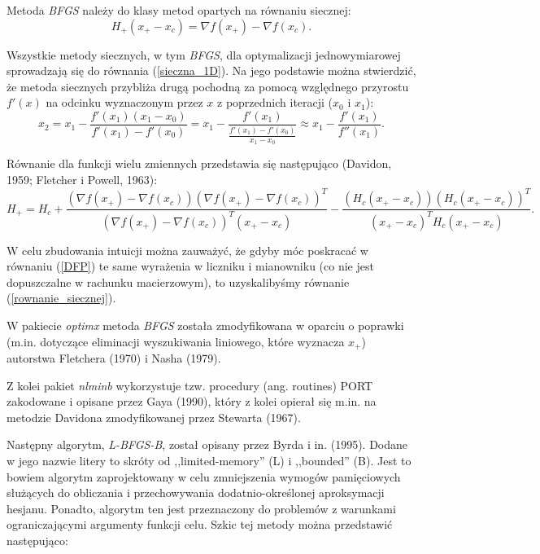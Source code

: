 Metoda \textit{BFGS} należy do klasy metod opartych na równaniu siecznej: 
\begin{equation}
\label{rownanie_siecznej}
H_{+} (x_{+} - x_{c}) = \nabla f(x_{+}) - \nabla f(x_{c}). 
\end{equation}

Wszystkie metody siecznych, w tym \textit{BFGS}, dla optymalizacji jednowymiarowej sprowadzają się do  równania (\ref{sieczna_1D}). Na jego podstawie można stwierdzić, że metoda siecznych przybliża drugą pochodną za pomocą względnego przyrostu $f'(x)$ na odcinku wyznaczonym przez $x$ z poprzednich iteracji ($x_{0}$ i $x_{1}$):
\begin{equation}
\label{sieczna_1D}
x_{2} = x_{1} - \frac{f'(x_{1})(x_{1} - x_{0})}{f'(x_{1}) - f'(x_{0})} =  x_{1} - \frac{f'(x_{1})}{\frac{f'(x_{1}) - f'(x_{0})}{x_{1} - x_{0}}} \approx x_{1} - \frac{f'(x_{1})}{f''(x_{1})}.
\end{equation}

Równanie dla funkcji wielu zmiennych przedstawia się następująco (Davidon, 1959; Fletcher i Powell, 1963)\nocite{Davidon_1959}\nocite{Fletcher_Powell_1963}:
\begin{equation}
\label{DFP}
H_{+} = H_{c} + \frac{(\nabla f(x_{+}) - \nabla f(x_{c})) (\nabla f(x_{+}) - \nabla f(x_{c}))^{T}}{(\nabla f(x_{+}) - \nabla f(x_{c}))^{T} (x_{+} - x_{c}) } - \frac{(H_{c}(x_{+} - x_{c}))(H_{c}(x_{+} - x_{c}))^{T}}{(x_{+} - x_{c})^{T}H_{c}(x_{+} - x_{c})}.
\end{equation}

W celu zbudowania intuicji można zauważyć, że gdyby móc poskracać w równaniu (\ref{DFP}) te same wyrażenia w liczniku i mianowniku (co nie jest dopuszczalne w rachunku macierzowym), to uzyskalibyśmy równanie (\ref{rownanie_siecznej}). 

W pakiecie \textit{optimx} metoda \textit{BFGS} została zmodyfikowana w oparciu o poprawki (m.in. dotyczące eliminacji wyszukiwania liniowego, które wyznacza $x_{+}$) autorstwa Fletchera (1970)\nocite{Fletcher_1970} i Nasha (1979)\nocite{Nash_1979}. 

Z kolei pakiet \textit{nlminb} wykorzystuje tzw. procedury (ang. routines) PORT zakodowane i opisane przez  Gaya (1990)\nocite{Gay_1990}, który z kolei opierał się m.in. na metodzie Davidona zmodyfikowanej  przez Stewarta (1967)\nocite{Stewart_1967}.  

Następny algorytm, \textit{L-BFGS-B}, został opisany przez Byrda i in. (1995)\nocite{Byrd_1995}. Dodane w jego nazwie litery to skróty od ,,limited-memory'' (L) i ,,bounded'' (B). Jest to bowiem algorytm zaprojektowany w celu zmniejszenia wymogów pamięciowych służących do obliczania i przechowywania dodatnio-określonej aproksymacji hesjanu. Ponadto, algorytm ten jest przeznaczony do problemów z warunkami ograniczającymi argumenty funkcji celu. Szkic tej metody można przedstawić następująco: 

